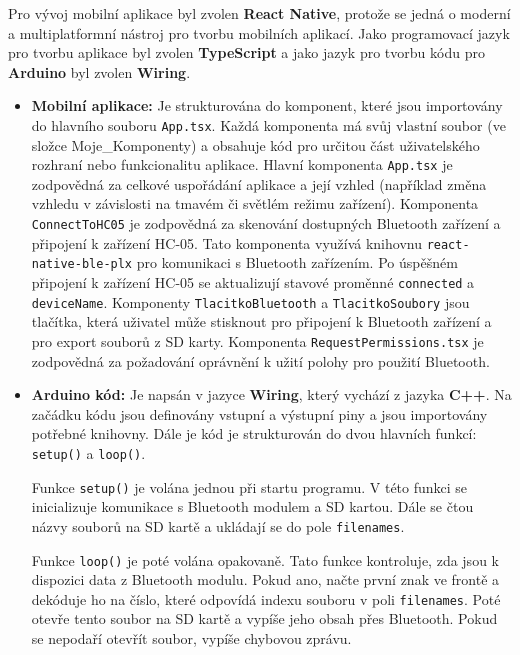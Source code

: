 \hspace{1 cm}
Pro vývoj mobilní aplikace byl zvolen \textbf{React Native}, protože se jedná o moderní a multiplatformní nástroj pro tvorbu mobilních aplikací. Jako programovací jazyk pro tvorbu aplikace byl zvolen \textbf{TypeScript} a jako jazyk pro tvorbu kódu pro \textbf{Arduino} byl zvolen \textbf{Wiring}.

\begin{itemize}
    \item \textbf{Mobilní aplikace:} Je strukturována do komponent, které jsou importovány do hlavního souboru \texttt{App.tsx}. Každá komponenta má svůj vlastní soubor (ve složce Moje\_Komponenty) a obsahuje kód pro určitou část uživatelského rozhraní nebo funkcionalitu aplikace. Hlavní komponenta \texttt{App.tsx} je zodpovědná za celkové uspořádání aplikace a její vzhled (například změna vzhledu v závislosti na tmavém či světlém režimu zařízení). Komponenta \texttt{ConnectToHC05} je zodpovědná za skenování dostupných Bluetooth zařízení a připojení k zařízení HC-05. Tato komponenta využívá knihovnu \texttt{react-native-ble-plx} pro komunikaci s Bluetooth zařízením. Po úspěšném připojení k zařízení HC-05 se aktualizují stavové proměnné \texttt{connected} a \texttt{deviceName}. Komponenty \texttt{TlacitkoBluetooth} a \texttt{TlacitkoSoubory} jsou tlačítka, která uživatel může stisknout pro připojení k Bluetooth zařízení a pro export souborů z SD karty. Komponenta \texttt{RequestPermissions.tsx} je zodpovědná za požadování oprávnění k užití polohy pro použití Bluetooth.
    
    \item \textbf{Arduino kód:} Je napsán v jazyce \textbf{Wiring}, který vychází z jazyka \textbf{C++}. Na začádku kódu jsou definovány vstupní a výstupní piny a jsou importovány potřebné knihovny. Dále je kód je strukturován do dvou hlavních funkcí: \texttt{setup()} a \texttt{loop()}. 

    Funkce \texttt{setup()} je volána jednou při startu programu. V této funkci se inicializuje komunikace s Bluetooth modulem a SD kartou. Dále se čtou názvy souborů na SD kartě a ukládají se do pole \texttt{filenames}.

    Funkce \texttt{loop()} je poté volána opakovaně. Tato funkce kontroluje, zda jsou k dispozici data z Bluetooth modulu. Pokud ano, načte první znak ve frontě a dekóduje ho na číslo, které odpovídá indexu souboru v poli \texttt{filenames}. Poté otevře tento soubor na SD kartě a vypíše jeho obsah přes Bluetooth. Pokud se nepodaří otevřít soubor, vypíše chybovou zprávu.


\end{itemize}

